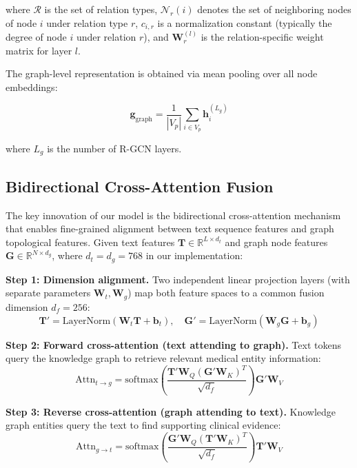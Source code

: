 \documentclass[11pt,onecolumn,a4paper]{article}
\begin{document}
where $\mathcal{R}$ is the set of relation types, $\mathcal{N}_r(i)$ denotes the set of neighboring nodes of node $i$ under relation type $r$, $c_{i,r}$ is a normalization constant (typically the degree of node $i$ under relation $r$), and $\mathbf{W}_r^{(l)}$ is the relation-specific weight matrix for layer $l$.

The graph-level representation is obtained via mean pooling over all node embeddings:

\begin{equation}\label{eq:3}
    \mathbf{g}_{\text{graph}} = \frac{1}{|V_p|} \sum_{i \in V_p} \mathbf{h}_i^{(L_g)}
\end{equation}

where $L_g$ is the number of R-GCN layers.

\subsection{Bidirectional Cross-Attention Fusion}

The key innovation of our model is the bidirectional cross-attention mechanism that enables fine-grained alignment between text sequence features and graph topological features. Given text features $\mathbf{T} \in \mathbb{R}^{L \times d_t}$ and graph node features $\mathbf{G} \in \mathbb{R}^{N \times d_g}$, where $d_t = d_g = 768$ in our implementation:

\textbf{Step 1: Dimension alignment.} Two independent linear projection layers (with separate parameters $\mathbf{W}_t, \mathbf{W}_g$) map both feature spaces to a common fusion dimension $d_f = 256$:
\begin{equation}\label{eq:4}
    \mathbf{T}' = \text{LayerNorm}(\mathbf{W}_t \mathbf{T} + \mathbf{b}_t), \quad \mathbf{G}' = \text{LayerNorm}(\mathbf{W}_g \mathbf{G} + \mathbf{b}_g)
\end{equation}

\textbf{Step 2: Forward cross-attention (text attending to graph).} Text tokens query the knowledge graph to retrieve relevant medical entity information:
\begin{equation}\label{eq:5}
    \text{Attn}_{t \rightarrow g} = \text{softmax}\left(\frac{\mathbf{T}' \mathbf{W}_Q (\mathbf{G}' \mathbf{W}_K)^T}{\sqrt{d_f}}\right) \mathbf{G}' \mathbf{W}_V
\end{equation}

\textbf{Step 3: Reverse cross-attention (graph attending to text).} Knowledge graph entities query the text to find supporting clinical evidence:
\begin{equation}\label{eq:6}
    \text{Attn}_{g \rightarrow t} = \text{softmax}\left(\frac{\mathbf{G}' \mathbf{W}_Q (\mathbf{T}' \mathbf{W}_K)^T}{\sqrt{d_f}}\right) \mathbf{T}' \mathbf{W}_V
\end{equation}
\end{document}
